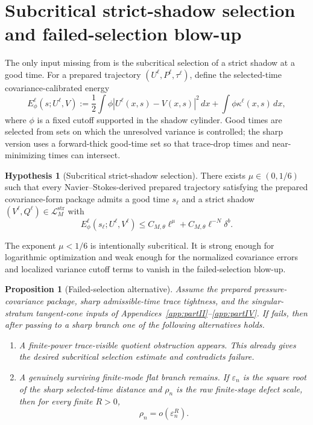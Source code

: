 \documentclass[11pt]{article}
\numberwithin{equation}{section}
\theoremstyle{plain}
\newtheorem{proposition}{Proposition}[section]
\theoremstyle{definition}
\newtheorem{hypothesis}{Hypothesis}[section]
\theoremstyle{remark}
\newcommand{\eps}{\varepsilon}
\newcommand{\str}{\mathrm{str}}
\newcommand{\calL}{\mathcal L}
\begin{document}
\section{Subcritical strict-shadow selection and failed-selection blow-up}\label{sec:main-selection}

The only input missing from  is the subcritical selection of a strict shadow at a good time.  For a prepared trajectory \((U^\ell,P^\ell,\tau^\ell)\), define the selected-time covariance-calibrated energy
\begin{equation}\label{eq:main-selected-energy}
        E^\ell_\phi(s;U^\ell,V)
        :=\frac12\int \phi |U^\ell(x,s)-V(x,s)|^2\,dx
        +\int \phi\kappa^\ell(x,s)\,dx,
\end{equation}
where \(\phi\) is a fixed cutoff supported in the shadow cylinder.  Good times are selected from sets on which the unresolved variance is controlled; the sharp version uses a forward-thick good-time set so that trace-drop times and near-minimizing times can intersect.

\begin{hypothesis}[Subcritical strict-shadow selection]\label{hyp:main-subcritical-selection}
There exists \(\mu\in(0,1/6)\) such that every Navier--Stokes-derived prepared trajectory satisfying the prepared covariance-form package admits a good time \(s_\ell\) and a strict shadow \((V^\ell,Q^\ell)\in\calL_M^{\str}\) with
\begin{equation}\label{eq:main-subcritical-selection}
        E^\ell_\phi(s_\ell;U^\ell,V^\ell)
        \le C_{M,\theta}\ell^\mu+C_{M,\theta}\ell^{-N}\delta^b.
\end{equation}
\end{hypothesis}

The exponent \(\mu<1/6\) is intentionally subcritical.  It is strong enough for logarithmic optimization and weak enough for the normalized covariance errors and localized variance cutoff terms to vanish in the failed-selection blow-up.

\begin{proposition}[Failed-selection alternative]\label{prop:main-failed-selection}
Assume the prepared pressure-covariance package, sharp admissible-time trace tightness, and the singular-stratum tangent-cone inputs of Appendices~\ref{app:partII}--\ref{app:partIV}.  If  fails, then after passing to a sharp branch one of the following alternatives holds.
\begin{enumerate}[label=(\alph*)]
\item A finite-power trace-visible quotient obstruction appears.  This already gives the desired subcritical selection estimate and contradicts failure.
\item A genuinely surviving finite-mode flat branch remains.  If \(\eps_n\) is the square root of the sharp selected-time distance and \(\rho_n\) is the raw finite-stage defect scale, then for every finite \(R>0\),
\begin{equation}\label{eq:main-flat-survival}
        \rho_n=o(\eps_n^R).
\end{equation}
\end{enumerate}
\end{proposition}
\end{document}
